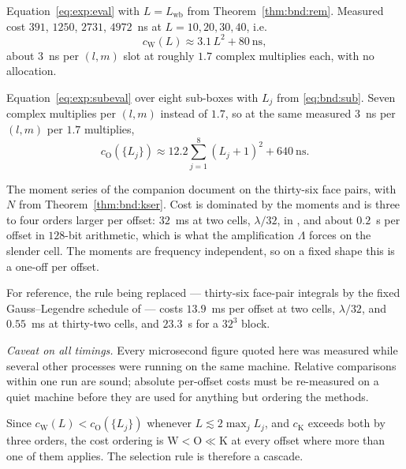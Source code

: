 \begin{description}[nosep,leftmargin=1.4em]
\item[\textbf{W} --- whole box.] Equation~\eqref{eq:exp:eval} with $L = L_{\mathrm{wb}}$
from Theorem~\ref{thm:bnd:rem}. Measured cost $391$, $1250$, $2731$, $4972$~ns at
$L = 10, 20, 30, 40$, i.e.
\begin{equation}
c_{\mathrm{W}}(L) \approx 3.1\,L^{2} + 80 \ \text{ns},
\label{eq:join:cw}
\end{equation}
about $3$~ns per $(l,m)$ slot at roughly $1.7$ complex multiplies each, with no
allocation.
\item[\textbf{O} --- octant split.] Equation~\eqref{eq:exp:subeval} over eight sub-boxes
with $L_j$ from \eqref{eq:bnd:sub}. Seven complex multiplies per $(l,m)$ instead of
$1.7$, so at the same measured $3$~ns per $(l,m)$ per $1.7$ multiplies,
\begin{equation}
c_{\mathrm{O}}(\{L_j\}) \approx 12.2 \sum_{j=1}^{8}(L_j+1)^{2} + 640 \ \text{ns}.
\label{eq:join:co}
\end{equation}
\item[\textbf{K} --- $k$-series.] The moment series of the companion document on the
thirty-six face pairs, with $N$ from Theorem~\ref{thm:bnd:kser}. Cost is dominated by the
moments and is three to four orders larger per offset: $32$~ms at two cells,
$\lambda/32$, in , and about $0.2$~s per offset in $128$-bit arithmetic,
which is what the amplification $\Lambda$ forces on the slender cell. The moments are
frequency independent, so on a fixed shape this is a one-off per offset.
\end{description}

For reference, the rule being replaced --- thirty-six face-pair integrals by the fixed
Gauss--Legendre schedule of  --- costs $13.9$~ms per offset at two cells,
$\lambda/32$, and $0.55$~ms at thirty-two cells, and $23.3$~s for a $32^3$ block.

\emph{Caveat on all timings.} Every microsecond figure quoted here was measured while
several other processes were running on the same machine. Relative comparisons within one
run are sound; absolute per-offset costs must be re-measured on a quiet machine before
they are used for anything but ordering the methods.

Since $c_{\mathrm{W}}(L) < c_{\mathrm{O}}(\{L_j\})$ whenever
$L \lesssim 2\max_j L_j$, and $c_{\mathrm{K}}$ exceeds both by three orders, the cost
ordering is $\mathrm{W} < \mathrm{O} \ll \mathrm{K}$ at every offset where more than one
of them applies. The selection rule is therefore a cascade.

